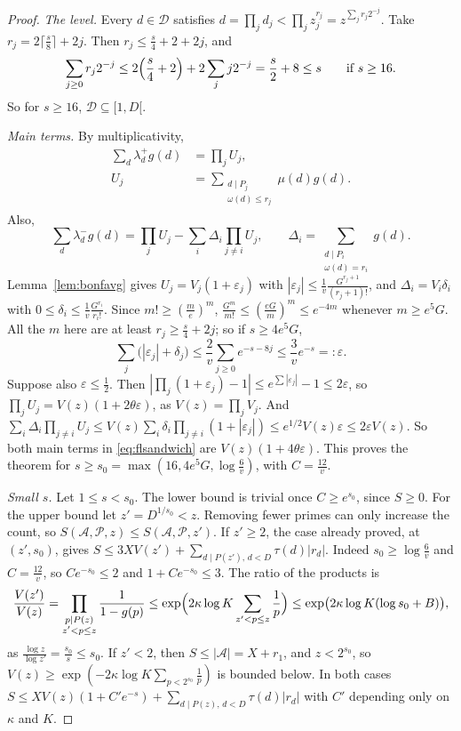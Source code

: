 \begin{proof}
\emph{The level.} Every $d\in\mathcal D$ satisfies $d=\prod_jd_j<\prod_jz_j^{r_j}=z^{\sum_jr_j2^{-j}}$. Take $r_j=2\lceil\frac s8\rceil+2j$. Then $r_j\le\frac s4+2+2j$, and
\[
\sum_{j\ge0}r_j2^{-j}\le2\Bigl(\frac s4+2\Bigr)+2\sum_jj2^{-j}=\frac s2+8\le s\qquad\text{if }s\ge16.
\]
So for $s\ge16$, $\mathcal D\subseteq[1,D[$.

\emph{Main terms.} By multiplicativity,
\[
\begin{aligned}
\sum_d\lambda^+_dg(d)&=\prod_jU_j,\\
U_j&=\sum_{\substack{d\mid P_j\\\omega(d)\le r_j}}\mu(d)g(d).
\end{aligned}
\]
Also,
\[
\sum_d\lambda^-_dg(d)=\prod_jU_j-\sum_i\Delta_i\prod_{j\ne i}U_j,\qquad\Delta_i=\sum_{\substack{d\mid P_i\\\omega(d)=r_i}}g(d).
\]
Lemma~\ref{lem:bonfavg} gives $U_j=V_j(1+\varepsilon_j)$ with $|\varepsilon_j|\le\frac1v\frac{G^{r_j+1}}{(r_j+1)!}$, and $\Delta_i=V_i\delta_i$ with $0\le\delta_i\le\frac1v\frac{G^{r_i}}{r_i!}$. Since $m!\ge(\frac me)^m$, $\frac{G^m}{m!}\le(\frac{eG}m)^m\le e^{-4m}$ whenever $m\ge e^5G$. All the $m$ here are at least $r_j\ge\frac s4+2j$; so if $s\ge4e^5G$,
\[
\sum_j\bigl(|\varepsilon_j|+\delta_j\bigr)\le\frac2v\sum_{j\ge0}e^{-s-8j}\le\frac3ve^{-s}=:\varepsilon.
\]
Suppose also $\varepsilon\le\frac12$. Then $|\prod_j(1+\varepsilon_j)-1|\le e^{\sum|\varepsilon_j|}-1\le2\varepsilon$, so $\prod_jU_j=V(z)(1+2\theta\varepsilon)$, as $V(z)=\prod_jV_j$. And $\sum_i\Delta_i\prod_{j\ne i}U_j\le V(z)\sum_i\delta_i\prod_{j\ne i}(1+|\varepsilon_j|)\le e^{1/2}V(z)\varepsilon\le2\varepsilon V(z)$. So both main terms in \eqref{eq:flsandwich} are $V(z)(1+4\theta\varepsilon)$. This proves the theorem for $s\ge s_0=\max(16,4e^5G,\log\frac6v)$, with $C=\frac{12}v$.

\emph{Small $s$.} Let $1\le s<s_0$. The lower bound is trivial once $C\ge e^{s_0}$, since $S\ge0$. For the upper bound let $z'=D^{1/s_0}<z$. Removing fewer primes can only increase the count, so $S(\mathcal A,\mathcal P,z)\le S(\mathcal A,\mathcal P,z')$. If $z'\ge2$, the case already proved, at $(z',s_0)$, gives $S\le3XV(z')+\sum_{d\mid P(z'),\,d<D}\tau(d)|r_d|$. Indeed $s_0\ge\log\frac6v$ and $C=\frac{12}v$, so $Ce^{-s_0}\le2$ and $1+Ce^{-s_0}\le3$. The ratio of the products is
\[
\frac{V(z')}{V(z)}=\prod_{\substack{p\mid P(z)\\z'<p\le z}}\frac1{1-g(p)}\le\exp\Bigl(2\kappa\log K\sum_{z'<p\le z}\frac1p\Bigr)\le\exp\bigl(2\kappa\log K(\log s_0+B)\bigr),
\]
as $\frac{\log z}{\log z'}=\frac{s_0}s\le s_0$. If $z'<2$, then $S\le|\mathcal A|=X+r_1$, and $z<2^{s_0}$, so $V(z)\ge\exp(-2\kappa\log K\sum_{p<2^{s_0}}\frac1p)$ is bounded below. In both cases $S\le XV(z)(1+C'e^{-s})+\sum_{d\mid P(z),\,d<D}\tau(d)|r_d|$ with $C'$ depending only on $\kappa$ and $K$.
\end{proof}

